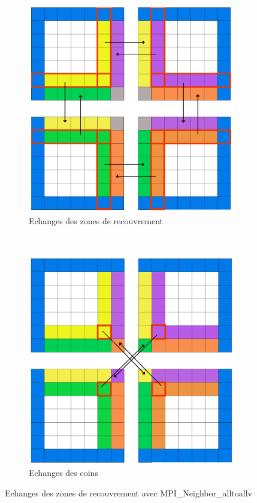 \begin{figure}[!ht]
  \centering
  \begin{subfigure}[b]{0.5\textwidth}
    \centering
    \includegraphics[scale=0.12]{figures/neigh1.png}
    \caption{\label{fig:comm_neigh}Echanges des zones de recouvrement}
  \end{subfigure}%
  ~
  \begin{subfigure}[b]{0.5\textwidth}
    \centering
    \includegraphics[scale=0.12]{figures/comm3.png}
    \caption{\label{fig:comm_diag}Echanges des coins}
  \end{subfigure}
  \caption{\label{fig:comm_neighbors}Echanges des zones de recouvrement avec MPI\_Neighbor\_alltoallv}
\end{figure}

